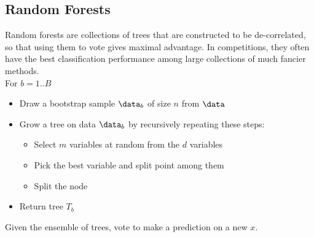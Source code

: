 

\subsection{Random Forests}

Random forests are collections of trees that are constructed to be
de-correlated, so that using them to vote gives maximal advantage.
In competitions, they often have the best classification performance
among large collections of much fancier methods. \\

\noindent For $b = 1 .. B$
\begin{itemize}
\item Draw a bootstrap sample $\data_b$ of size $n$ from $\data$
\item Grow a tree on data $\data_b$ by recursively repeating these
  steps:
\begin{itemize}
\item Select $m$ variables at random from the $d$ variables
\item Pick the best variable and split point among them
\item Split the node
\end{itemize}
\item Return tree $T_b$
\end{itemize}
Given the ensemble of trees, vote to make a prediction on a new $x$.


